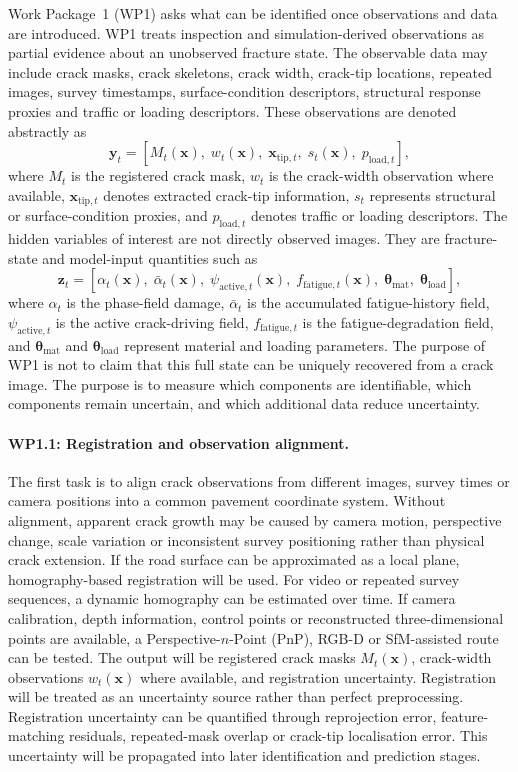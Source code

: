 Work Package~1 (WP1) asks what can be identified once observations and data are introduced.
WP1 treats inspection and simulation-derived observations as partial evidence about an unobserved fracture state.
The observable data may include crack masks, crack skeletons, crack width, crack-tip locations, repeated images, survey timestamps, surface-condition descriptors, structural response proxies and traffic or loading descriptors.
These observations are denoted abstractly as
\[
    \mathbf{y}_t = \left[M_t(\mathbf{x}),\; w_t(\mathbf{x}),\; \mathbf{x}_{\mathrm{tip},t},\; s_t(\mathbf{x}),\; p_{\mathrm{load},t}\right],
\]
where $M_t$ is the registered crack mask, $w_t$ is the crack-width observation where available, $\mathbf{x}_{\mathrm{tip},t}$ denotes extracted crack-tip information, $s_t$ represents structural or surface-condition proxies, and $p_{\mathrm{load},t}$ denotes traffic or loading descriptors.
The hidden variables of interest are not directly observed images.
They are fracture-state and model-input quantities such as
\[
    \mathbf{z}_t = \left[\alpha_t(\mathbf{x}),\; \bar{\alpha}_t(\mathbf{x}),\; \psi_{\mathrm{active},t}(\mathbf{x}),\; f_{\mathrm{fatigue},t}(\mathbf{x}),\; \boldsymbol{\theta}_{\mathrm{mat}},\; \boldsymbol{\theta}_{\mathrm{load}}\right],
\]
where $\alpha_t$ is the phase-field damage, $\bar{\alpha}_t$ is the accumulated fatigue-history field, $\psi_{\mathrm{active},t}$ is the active crack-driving field, $f_{\mathrm{fatigue},t}$ is the fatigue-degradation field, and $\boldsymbol{\theta}_{\mathrm{mat}}$ and $\boldsymbol{\theta}_{\mathrm{load}}$ represent material and loading parameters.
The purpose of WP1 is not to claim that this full state can be uniquely recovered from a crack image.
The purpose is to measure which components are identifiable, which components remain uncertain, and which additional data reduce uncertainty.

\paragraph{WP1.1: Registration and observation alignment.}
The first task is to align crack observations from different images, survey times or camera positions into a common pavement coordinate system.
Without alignment, apparent crack growth may be caused by camera motion, perspective change, scale variation or inconsistent survey positioning rather than physical crack extension.
If the road surface can be approximated as a local plane, homography-based registration will be used.
For video or repeated survey sequences, a dynamic homography can be estimated over time.
If camera calibration, depth information, control points or reconstructed three-dimensional points are available, a Perspective-$n$-Point (PnP), RGB-D or SfM-assisted route can be tested.
The output will be registered crack masks $M_t(\mathbf{x})$, crack-width observations $w_t(\mathbf{x})$ where available, and registration uncertainty.
Registration will be treated as an uncertainty source rather than perfect preprocessing.
Registration uncertainty can be quantified through reprojection error, feature-matching residuals, repeated-mask overlap or crack-tip localisation error.
This uncertainty will be propagated into later identification and prediction stages.

